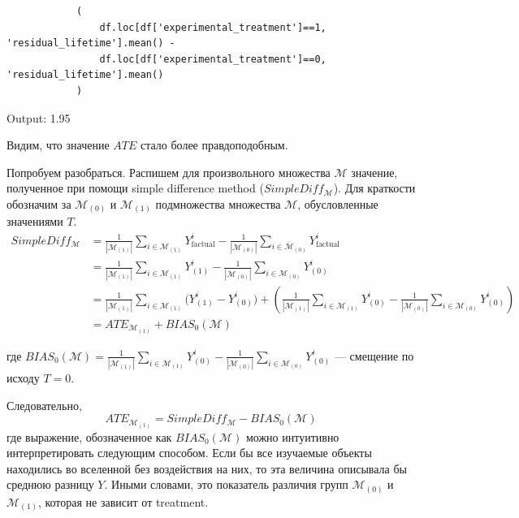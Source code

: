 \documentclass{article}
\begin{document}
        

        \begin{verbatim}
            (
                df.loc[df['experimental_treatment']==1, 'residual_lifetime'].mean() -
                df.loc[df['experimental_treatment']==0, 'residual_lifetime'].mean()
            )
        \end{verbatim}

        Output: 1.95

        Видим, что значение $ATE$ стало более правдоподобным.

        Попробуем разобраться.
        Распишем для произвольного множества $\mathcal{M}$ значение, полученное при помощи simple difference method ($SimpleDiff_\mathcal{M}$).
        Для краткости обозначим за $\mathcal{M}_{(0)}$ и $\mathcal{M}_{(1)}$ подмножества множества $\mathcal{M}$, обусловленные значениями $T$.
        \begin{align*}
            SimpleDiff_\mathcal{M} &=
            \frac{1}{|\mathcal{M}_{(1)}|} \sum_{i \in \mathcal{M}_{(1)}} Y^i_{\text{factual}} -
            \frac{1}{|\mathcal{M}_{(0)}|} \sum_{i \in \mathcal{M}_{(0)}} Y^i_{\text{factual}} \\
            &= \frac{1}{|\mathcal{M}_{(1)}|} \sum_{i \in \mathcal{M}_{(1)}} Y^i_{(1)} -
            \frac{1}{|\mathcal{M}_{(0)}|} \sum_{i \in \mathcal{M}_{(0)}} Y^i_{(0)} \\
            &= \frac{1}{|\mathcal{M}_{(1)}|} \sum_{i \in \mathcal{M}_{(1)}} \big( Y^i_{(1)} - Y^i_{(0)} \big) +
            \left( \frac{1}{|\mathcal{M}_{(1)}|} \sum_{i \in \mathcal{M}_{(1)}} Y^i_{(0)} -
            \frac{1}{|\mathcal{M}_{(0)}|} \sum_{i \in \mathcal{M}_{(0)}} Y^i_{(0)} \right) \\
            &= ATE_{\mathcal{M}_{(1)}} + BIAS_0(\mathcal{M})
        \end{align*}

        где $BIAS_0(\mathcal{M}) = \frac{1}{|\mathcal{M}_{(1)}|} \sum_{i \in \mathcal{M}_{(1)}} Y^i_{(0)} -
            \frac{1}{|\mathcal{M}_{(0)}|} \sum_{i \in \mathcal{M}_{(0)}} Y^i_{(0)}$ --- смещение по исходу $T=0$.

        Следовательно,
        \[
            ATE_{\mathcal{M}_{(1)}} = SimpleDiff_\mathcal{M} - BIAS_0(\mathcal{M})
        \]
        где выражение, обозначенное как $BIAS_0(\mathcal{M})$ можно интуитивно интерпретировать следующим способом.
        Если бы все изучаемые объекты находились во вселенной без воздействия на них, то эта величина описывала бы среднюю разницу $Y$.
        Иными словами, это показатель различия групп $\mathcal{M}_{(0)}$ и $\mathcal{M}_{(1)}$, которая не зависит от treatment.
\end{document}
